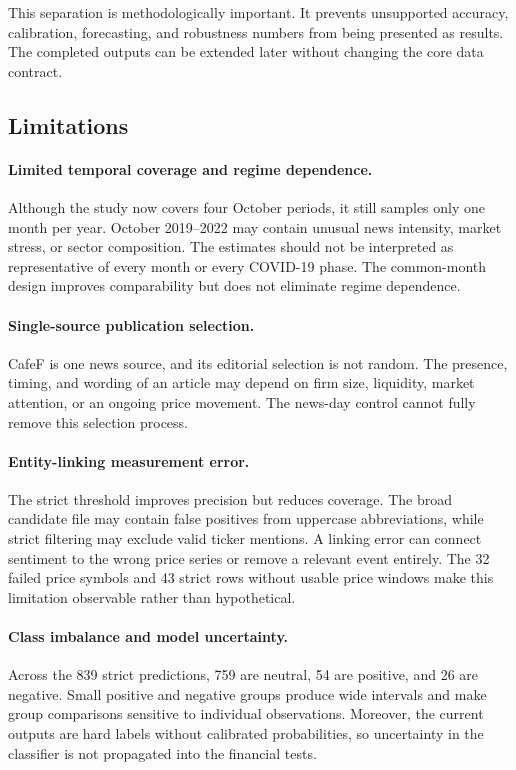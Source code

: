 This separation is methodologically important. It prevents unsupported accuracy, calibration, forecasting, and robustness numbers from being presented as results. The completed outputs can be extended later without changing the core data contract.

\subsection{Limitations}
\label{subsec:limitations-statistical}

\paragraph{Limited temporal coverage and regime dependence.}
Although the study now covers four October periods, it still samples only one month per year. October 2019--2022 may contain unusual news intensity, market stress, or sector composition. The estimates should not be interpreted as representative of every month or every COVID-19 phase. The common-month design improves comparability but does not eliminate regime dependence.

\paragraph{Single-source publication selection.}
CafeF is one news source, and its editorial selection is not random. The presence, timing, and wording of an article may depend on firm size, liquidity, market attention, or an ongoing price movement. The news-day control cannot fully remove this selection process.

\paragraph{Entity-linking measurement error.}
The strict threshold improves precision but reduces coverage. The broad candidate file may contain false positives from uppercase abbreviations, while strict filtering may exclude valid ticker mentions. A linking error can connect sentiment to the wrong price series or remove a relevant event entirely. The 32 failed price symbols and 43 strict rows without usable price windows make this limitation observable rather than hypothetical.

\paragraph{Class imbalance and model uncertainty.}
Across the 839 strict predictions, 759 are neutral, 54 are positive, and 26 are negative. Small positive and negative groups produce wide intervals and make group comparisons sensitive to individual observations. Moreover, the current outputs are hard labels without calibrated probabilities, so uncertainty in the classifier is not propagated into the financial tests.

